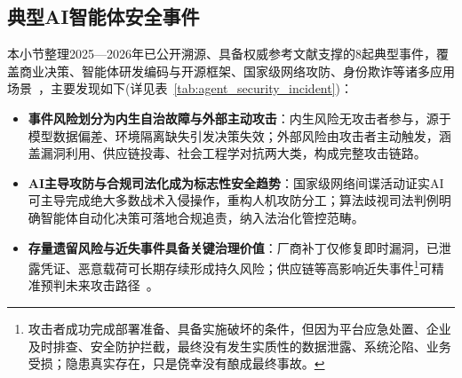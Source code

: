 \subsection{典型AI智能体安全事件}
本小节整理2025—2026年已公开溯源、具备权威参考文献支撑的8起典型事件，覆盖商业决策、智能体研发编码与开源框架、国家级网络攻防、身份欺诈等诸多应用场景~\cite{anthropicThreatIntel2025,anthropicGTG1002_2025}，主要发现如下(详见表~\ref{tab:agent_security_incident})：

\begin{itemize}[tabitem]
 \item \textbf{事件风险划分为内生自治故障与外部主动攻击}：内生风险无攻击者参与，源于模型数据偏差、环境隔离缺失引发决策失效；外部风险由攻击者主动触发，涵盖漏洞利用、供应链投毒、社会工程学对抗两大类，构成完整攻击链路\cite{replitDatabaseDeletion2025,openclawMoltbookBreach2026}。
 
 \item \textbf{AI主导攻防与合规司法化成为标志性安全趋势}：国家级网络间谍活动证实AI可主导完成绝大多数战术入侵操作，重构人机攻防分工；算法歧视司法判例明确智能体自动化决策可落地合规追责，纳入法治化管控范畴\cite{anthropicGTG1002_2025}。

 \item \textbf{存量遗留风险与近失事件具备关键治理价值}：厂商补丁仅修复即时漏洞，已泄露凭证、恶意载荷可长期存续形成持久风险；供应链等高影响近失事件\footnote{攻击者成功完成部署准备、具备实施破坏的条件，但因为平台应急处置、企业及时排查、安全防护拦截，最终没有发生实质性的数据泄露、系统沦陷、业务受损；隐患真实存在，只是侥幸没有酿成最终事故。}可精准预判未来攻击路径~\cite{langgrinchCVE2025,amazonQCVE2025}。
\end{itemize}




\begingroup
\enlargethispage{1cm}
\footnotesize
\centering


